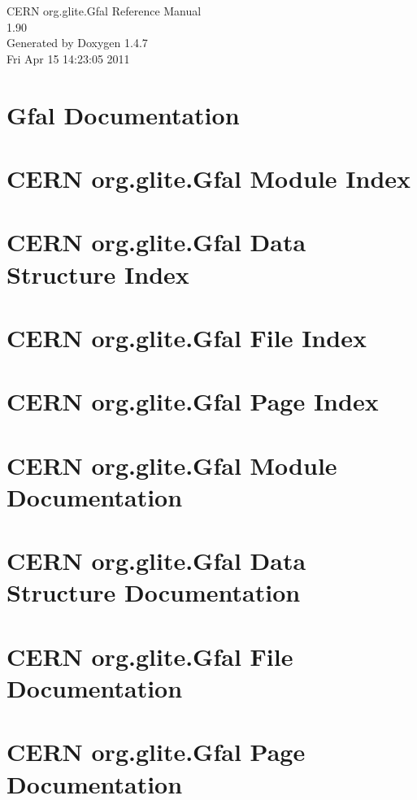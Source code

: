 \documentclass[a4paper]{book}
\begin{document}
\begin{titlepage}
\vspace*{7cm}
\begin{center}
{\Large CERN org.glite.Gfal Reference Manual\\[1ex]\large 1.90 }\\
\vspace*{1cm}
{\large Generated by Doxygen 1.4.7}\\
\vspace*{0.5cm}
{\small Fri Apr 15 14:23:05 2011}\\
\end{center}
\end{titlepage}
\clearemptydoublepage
{}
\tableofcontents
\clearemptydoublepage
{}
\chapter{Gfal Documentation }
\label{index}
\chapter{CERN org.glite.Gfal Module Index}

\chapter{CERN org.glite.Gfal Data Structure Index}

\chapter{CERN org.glite.Gfal File Index}

\chapter{CERN org.glite.Gfal Page Index}

\chapter{CERN org.glite.Gfal Module Documentation}





\chapter{CERN org.glite.Gfal Data Structure Documentation}


\chapter{CERN org.glite.Gfal File Documentation}









\chapter{CERN org.glite.Gfal Page Documentation}


\printindex
\end{document}
